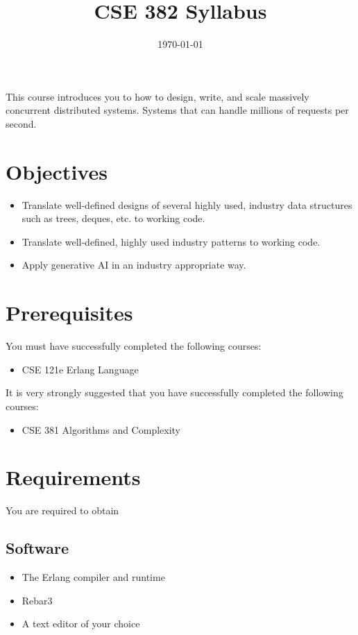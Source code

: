 \documentclass[12pt]{amsart}
\title{CSE 382 Syllabus}
\date{\today}
\begin{document}
\maketitle
This course introduces you to how to design, write, and scale massively concurrent distributed systems. Systems that can handle millions of requests per second.


\section{Objectives}
\begin{itemize}
	\item Translate well-defined designs of several highly used, industry data structures such as trees, deques, etc. to working code.
\item Translate well-defined, highly used industry patterns to working code.
\item Apply generative AI in an industry appropriate way.

\end{itemize}

\section{Prerequisites}

  You must have successfully completed the following courses:
\begin{itemize}
    \item CSE 121e Erlang Language
\end{itemize}
  It is very strongly suggested that you have successfully completed the following courses:
\begin{itemize}
    \item CSE 381 Algorithms and Complexity
\end{itemize}

\section{Requirements}
You are required to obtain
\subsection{Software}
	\begin{itemize}
		\item The Erlang compiler and runtime
		\item Rebar3
		\item A text editor of your choice
	\end{itemize}
\end{document}
